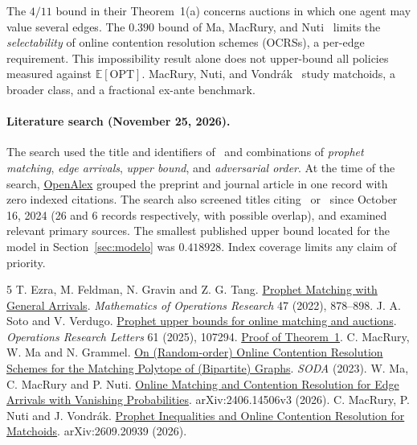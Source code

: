 \documentclass[11pt,a4paper]{article}
\newcommand{\E}{\mathbb{E}}
\newcommand{\OPT}{\mathrm{OPT}}
\begin{document}
The \(4/11\) bound in their Theorem~1(a) concerns auctions in which one agent may value several edges. The \(0.390\) bound of Ma, MacRury, and Nuti~\cite{mmn} limits the \emph{selectability} of online contention resolution schemes (OCRSs), a per-edge requirement. This impossibility result alone does not upper-bound all policies measured against \(\E[\OPT]\). MacRury, Nuti, and Vondr\'ak~\cite{mnv} study matchoids, a broader class, and a fractional ex-ante benchmark.

\paragraph{Literature search (November 25, 2026).}
The search used the title and identifiers of~\cite{sv} and combinations of \emph{prophet matching}, \emph{edge arrivals}, \emph{upper bound}, and \emph{adversarial order}. At the time of the search, \href{https://openalex.org/W4409264837}{OpenAlex} grouped the preprint and journal article in one record with zero indexed citations. The search also screened titles citing~\cite{ezra} or~\cite{mmg} since October 16, 2024 (26 and 6 records respectively, with possible overlap), and examined relevant primary sources. The smallest published upper bound located for the model in Section~\ref{sec:modelo} was \(0.418928\). Index coverage limits any claim of priority.

\begingroup\small
{}
\begin{thebibliography}{5}\setlength{\itemsep}{2pt}
 T. Ezra, M. Feldman, N. Gravin and Z. G. Tang.
\href{https://doi.org/10.1287/moor.2021.1152}{Prophet Matching with General Arrivals}.
\emph{Mathematics of Operations Research} 47 (2022), 878--898.
 J. A. Soto and V. Verdugo.
\href{https://doi.org/10.1016/j.orl.2025.107294}{Prophet upper bounds for online matching and auctions}.
\emph{Operations Research Letters} 61 (2025), 107294. \href{https://arxiv.org/html/2410.12756v1#S3}{Proof of Theorem~1}.
 C. MacRury, W. Ma and N. Grammel.
\href{https://doi.org/10.1137/1.9781611977554.ch76}{On (Random-order) Online Contention Resolution Schemes for the Matching Polytope of (Bipartite) Graphs}.
\emph{SODA} (2023).
 W. Ma, C. MacRury and P. Nuti.
\href{https://arxiv.org/abs/2406.14506v3}{Online Matching and Contention Resolution for Edge Arrivals with Vanishing Probabilities}.
arXiv:2406.14506v3 (2026).
 C. MacRury, P. Nuti and J. Vondrák.
\href{https://arxiv.org/abs/2609.20939}{Prophet Inequalities and Online Contention Resolution for Matchoids}.
arXiv:2609.20939 (2026).
\end{thebibliography}
\endgroup
\end{document}
